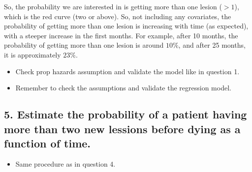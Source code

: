 \documentclass[
  11pt,
]{article}
\providecommand{\tightlist}{%
  \setlength{\itemsep}{0pt}\setlength{\parskip}{0pt}}
\begin{document}
So, the probability we are interested in is getting more than one lesion
(\(>1\)), which is the red curve (two or above). So, not including any
covariates, the probability of getting more than one lesion is
increasing with time (as expected), with a steeper increase in the first
months. For example, after 10 months, the probability of getting more
than one lesion is around \(10 \%\), and after 25 months, it is
approximately \(23 \%\).

\begin{itemize}
\item
  Check prop hazards assumption and validate the model like in question
  1.
\item
  Remember to check the assumptions and validate the regression model.
\end{itemize}

\hypertarget{estimate-the-probability-of-a-patient-having-more-than-two-new-lessions-before-dying-as-a-function-of-time.}{%
\subsection{5. Estimate the probability of a patient having more than
two new lessions before dying as a function of
time.}\label{estimate-the-probability-of-a-patient-having-more-than-two-new-lessions-before-dying-as-a-function-of-time.}}

\begin{itemize}
\tightlist
\item
  Same procedure as in question 4.
\end{itemize}
\end{document}
